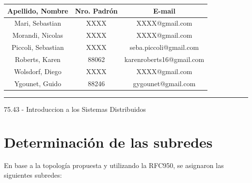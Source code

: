 \documentclass[12pt,titlepage]{article}
\begin{document}
\begin{titlepage}
\begin{center}
\large\addtolength{\tabcolsep}{-3pt}
\begin{tabular}{|| c | c | c ||}
  \hline
    \textbf{Apellido, Nombre} & \textbf{Nro. Padrón} & \textbf{E-mail} \\
  \hline
    Mari, Sebastian & XXXX & XXXX@gmail.com \\
  \hline
    Morandi, Nicolas & XXXX & XXXX@gmail.com \\
  \hline
    Piccoli, Sebastian & XXXX & seba.piccoli@gmail.com \\
  \hline
    Roberts, Karen & 88062 & karenroberts16@gmail.com \\
  \hline
    Wolsdorf, Diego & XXXX & XXXX@gmail.com \\
  \hline
    Ygounet, Guido & 88246 & gygounet@gmail.com \\
  \hline
\end{tabular}
\end{center}

\vfill

\hrule
\vspace{0.2cm}

\noindent\small{75.43 - Introduccion a los Sistemas Distribuidos}

\end{titlepage}



\setcounter{page}{1}

\tableofcontents
\newpage



\section{Determinación de las subredes}

En base a la topolog\'ia propuesta y utilizando la RFC950, se asignaron las siguientes subredes:
\end{document}
